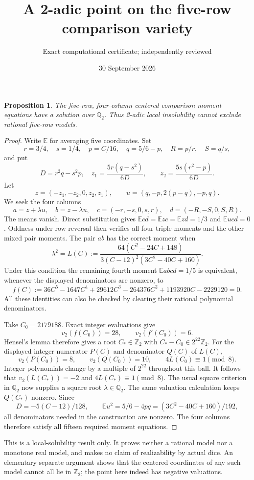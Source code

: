 \documentclass[11pt]{article}
\title{A 2-adic point on the five-row comparison variety}
\author{Exact computational certificate; independently reviewed}
\date{30 September 2026}
\newtheorem{proposition}{Proposition}
\begin{document}
\maketitle
\begin{proposition}
The five-row, four-column centered comparison moment equations have
a solution over $\mathbb Q_2$. Thus 2-adic local insolubility cannot
exclude rational five-row models.
\end{proposition}
\begin{proof}
Write $\mathbb E$ for averaging five coordinates. Set
\[
 r=3/4,\quad s=1/4,\quad p=C/16,\quad q=5/6-p,
 \quad R=p/r,\quad S=q/s,
\]
and put
\[
 D=r^2q-s^2p,\quad
 z_1=\frac{5r(q-s^2)}{6D},\qquad
 z_2=\frac{5s(r^2-p)}{6D}.
\]
Let
\[
 z=(-z_1,-z_2,0,z_2,z_1),\qquad
 u=(q,-p,2(p-q),-p,q).
\]
We seek the four columns
\[
 a=z+\lambda u,\quad b=z-\lambda u,\quad
 c=(-r,-s,0,s,r),\quad d=(-R,-S,0,S,R).
\]
The means vanish. Direct substitution gives
$\mathbb Ecd=\mathbb Ezc=\mathbb Ezd=1/3$ and
$\mathbb Eucd=0$. Oddness under row reversal then verifies all
four triple moments and the other mixed pair moments. The pair $ab$
has the correct moment when
\[
 \lambda^2=L(C):=
 \frac{64(C^2-24C+148)}{3(C-12)^2(3C^2-40C+160)}.
\]
Under this condition the remaining fourth moment
$\mathbb Eabcd=1/5$ is equivalent, whenever the displayed
denominators are nonzero, to
\[
 f(C):=36C^5-1647C^4+29612C^3-264376C^2+1193920C-2229120=0.
\]
All these identities can also be checked by clearing their rational
polynomial denominators.

Take $C_0=2179188$. Exact integer evaluations give
\[
 v_2(f(C_0))=28,\qquad v_2(f'(C_0))=6.
\]
Hensel's lemma therefore gives a root $C_*\in\mathbb Z_2$ with
$C_*-C_0\in2^{22}\mathbb Z_2$. For the displayed integer numerator
$P(C)$ and denominator $Q(C)$ of $L(C)$,
\[
 v_2(P(C_0))=8,\qquad v_2(Q(C_0))=10,
 \qquad 4L(C_0)\equiv1\pmod8.
\]
Integer polynomials change by a multiple of $2^{22}$ throughout
this ball. It follows that $v_2(L(C_*))=-2$ and
$4L(C_*)\equiv1\pmod8$. The usual square criterion in $\mathbb Q_2$
now supplies a square root $\lambda\in\mathbb Q_2$.
The same valuation calculation keeps $Q(C_*)$ nonzero. Since
\[
 D=-5(C-12)/128,\qquad
 \mathbb Eu^2=5/6-4pq=(3C^2-40C+160)/192,
\]
all denominators needed in the construction are nonzero. The four
columns therefore satisfy all fifteen required moment equations.
\end{proof}
This is a local-solubility result only. It proves neither a rational
model nor a monotone real model, and makes no claim of realizability
by actual dice. An elementary separate argument shows that the
centered coordinates of any such model cannot all lie in $\mathbb Z_2$;
the point here indeed has negative valuations.
\end{document}
